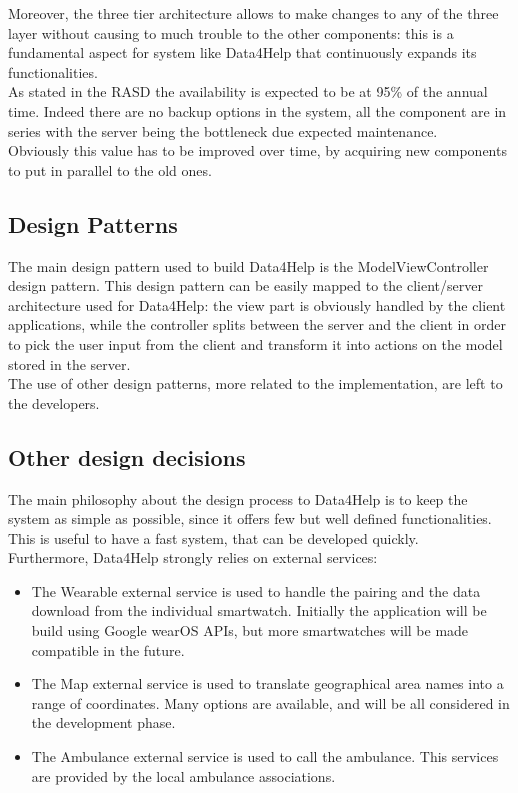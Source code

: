 Moreover, the three tier architecture allows to make changes to any of the three layer without causing to much trouble to the other components: this is a fundamental aspect for system like Data4Help that continuously expands its functionalities.
\\

As stated in the RASD the availability is expected to be at 95\% of the annual time. Indeed there are no backup options in the system, all the component are in series with the server being the bottleneck due expected maintenance.\\
Obviously this value has to be improved over time, by acquiring new components to put in parallel to the old ones.

\subsection{Design Patterns}
The main design pattern used to build Data4Help is the ModelViewController design pattern.
This design pattern can be easily mapped to the client/server architecture used for Data4Help: the 
view part is obviously handled by the client applications, while the controller splits between the server and the client in order to pick the user input from the client and transform it into actions on the model stored in the server.
\\
The use of other design patterns, more related to the implementation, are left to the developers. 

\subsection{Other design decisions}
The main philosophy about the design process to Data4Help is to keep the system as simple as possible, since it offers few but well defined functionalities. This is useful to have a fast system, that can be developed quickly.\\
Furthermore, Data4Help strongly relies on external services:
\begin{itemize}
\item The Wearable external service is used to handle the pairing and the data download from the individual smartwatch. Initially the application will be build using Google wearOS APIs, but more smartwatches will be made compatible in the future.
\item The Map external service is used to translate geographical area names into a range of coordinates. Many options are available, and will be all considered in the development phase.
\item The Ambulance external service is used to call the ambulance. This services are provided by the local ambulance associations.
\end{itemize}


